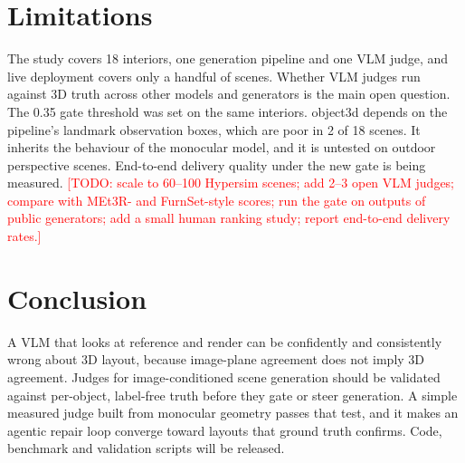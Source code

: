 \documentclass[10pt,twocolumn]{article}
\newcommand{\todo}[1]{\textcolor{red}{[TODO: #1]}}
\begin{document}
\section{Limitations}
The study covers 18 interiors, one generation pipeline and one VLM judge, and live deployment covers only a handful of scenes. Whether
VLM judges run against 3D truth across other models and generators is the main open question. The 0.35 gate threshold was set on the
same interiors. object3d depends on the pipeline's landmark observation boxes, which are poor in 2 of 18 scenes. It inherits the
behaviour of the monocular model, and it is untested on outdoor perspective scenes. End-to-end delivery quality under the new gate is
being measured. \todo{scale to 60--100 Hypersim scenes; add 2--3 open VLM judges; compare with MEt3R- and FurnSet-style scores; run
the gate on outputs of public generators; add a small human ranking study; report end-to-end delivery rates.}

\section{Conclusion}
A VLM that looks at reference and render can be confidently and consistently wrong about 3D layout, because image-plane agreement
does not imply 3D agreement. Judges for image-conditioned scene generation should be validated against per-object, label-free truth
before they gate or steer generation. A simple measured judge built from monocular geometry passes that test, and it makes an
agentic repair loop converge toward layouts that ground truth confirms. Code, benchmark and validation scripts will be released.

{\small}
\end{document}
